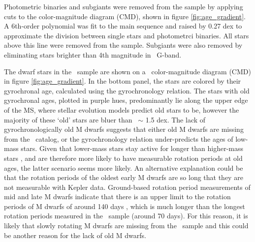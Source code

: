 Photometric binaries and subgiants were removed from the sample by applying
cuts to the color-magnitude diagram (CMD), shown in figure
\ref{fig:age_gradient}.
A 6th-order polynomial was fit to the main sequence and raised by 0.27 dex to
approximate the division between single stars and photometrci binaries.
All stars above this line were removed from the sample.
Subgiants were also removed by eliminating stars brighter than 4th magnitude
in \gaia\ G-band.

The dwarf stars in the \mct\ sample are shown on a \gaia\ color-magnitude
diagram (CMD) in figure \ref{fig:age_gradient}.
In the bottom panel, the stars are colored by their gyrochronal age,
calculated using the \citet{angus2019} gyrochronology relation.
The stars with old gyrochronal ages, plotted in purple hues, predominantly lie
along the upper edge of the MS, where stellar evolution models predict old
stars to be, however the majority of these `old' stars are bluer than \gcolor\
$\sim$ 1.5 dex.
The lack of gyrochronologically old M dwarfs suggests that either old M dwarfs
are missing from the \mct\ catalog, or the \citet{angus2019} gyrochronology
relation under-predicts the ages of low-mass stars.
Given that lower-mass stars stay active for longer than higher-mass stars
\citep[\eg][]{west2011}, and are therefore more likely to have measurable
rotation periods at old ages, the latter scenario seems more likely.
An alternative explanation could be that the rotation periods of the oldest
early M dwarfs are so long that they are not measurable with Kepler data.
Ground-based rotation period measurements of mid and late M dwarfs indicate
that there is an upper limit to the rotation periods of M dwarfs of around 140
days \citep{newton2016, newton2017, newton2018}, which is much longer than the
longest rotation periods measured in the \mct\ sample (around 70 days).
For this reason, it is likely that slowly rotating M dwarfs are missing from
the \mct\ sample and this could be another reason for the lack of old M
dwarfs.

